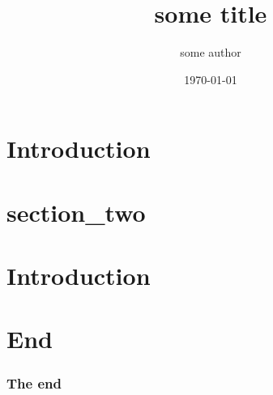 \documentclass[•]{beamer}
\title{some title}
\author{some author}
\date{\today}
\begin{document}
\begin{frame}
\titlepage
\end{frame}

\section{Introduction}
\begin{frame}
\end{frame}

\section{section_two}
\section{Introduction}
\begin{frame}
\end{frame}

\section{End}
\begin{frame}
\frametitle{The end}
\end{frame}
\end{document}
